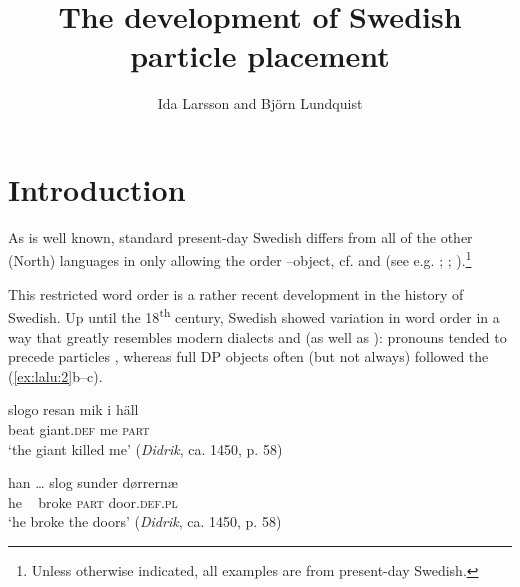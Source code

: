 \documentclass[output=paper]{langscibook}
\author{Ida Larsson\affiliation{Østfold University College, Halden} and Björn Lundquist\affiliation{The Arctic University of Norway, Tromsø}}
\title{The development of Swedish particle placement}
\begin{document}
\maketitle 

\section{Introduction}\label{sec:lalu:1}

\begin{sloppypar}
As is well known, standard present-day Swedish differs from all of the other (North)  languages in only allowing the order –object, cf.  and  (see e.g. \citealt{Svenonius1996, Svenonius2003}; \citealt{Toivonen2003}; \citealt{Lundquist2014Active}).\footnote{Unless otherwise indicated, all examples are from present-day Swedish.}
\end{sloppypar}

\ea\label{ex:lalu:1}
\z
\z


This restricted word order is a rather recent development in the history of Swedish. Up until the 18\textsuperscript{th} century, Swedish showed variation in word order in a way that greatly resembles modern  dialects and  (as well as ): pronouns tended to precede particles , whereas full DP objects often (but not always) followed the  (\ref{ex:lalu:2}b–c).


\ea\label{ex:lalu:2}
\ea\label{ex:lalu:2a}
\gll  slogo  resan       mik     {i häll}\\
 beat     giant.\textsc{def}   me     \textsc{part}\\
  \glt `the giant killed me’ (\textit{Didrik}, ca. 1450, p. 58)

\ex   \label{ex:lalu:2b}
\gll han …   slog  sunder   dørrernæ\\
      he  ~           broke  \textsc{part}       door\textsc{.def.pl}\\
  \glt   ‘he broke the doors’ (\textit{Didrik}, ca. 1450, p. 58)
\end{document}

